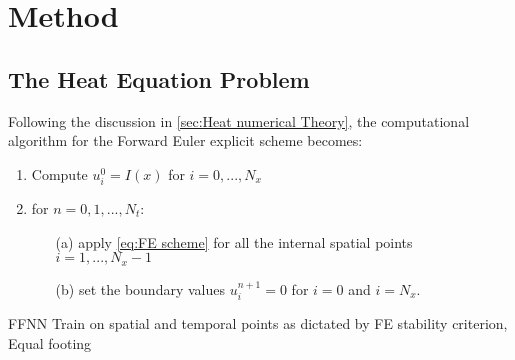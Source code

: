 \section{Method}\label{sec:Method}

\subsection{The Heat Equation Problem}\label{sec:heat method}

Following the discussion in \autoref{sec:Heat numerical Theory}, the computational algorithm \cite{hpl} for the Forward Euler explicit scheme becomes:
\begin{enumerate}
    \item Compute $u_i^0 = I(x)$ for $i=0, ..., N_x$
    \item for $n=0,1, ..., N_t$:
        \begin{itemize}
            \item[(a)] apply \autoref{eq:FE scheme} for all the internal spatial points $i=1, ..., N_x - 1$
            \item[(b)] set the boundary values $u_i^{n+1}=0$ for $i=0$ and $i=N_x$.
        \end{itemize}
\end{enumerate}

FFNN
Train on spatial and temporal points as dictated by FE stability criterion, Equal footing

